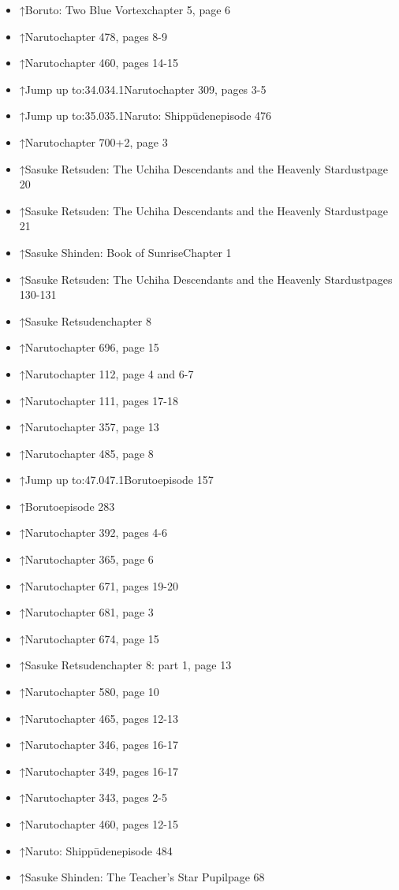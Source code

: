 \documentclass[a4paper,12pt]{article}
\begin{document}
\begin{itemize}
\item ↑Boruto: Two Blue Vortexchapter 5, page 6
\item ↑Narutochapter 478, pages 8-9
\item ↑Narutochapter 460, pages 14-15
\item ↑Jump up to:34.034.1Narutochapter 309, pages 3-5
\item ↑Jump up to:35.035.1Naruto: Shippūdenepisode 476
\item ↑Narutochapter 700+2, page 3
\item ↑Sasuke Retsuden: The Uchiha Descendants and the Heavenly Stardustpage 20
\item ↑Sasuke Retsuden: The Uchiha Descendants and the Heavenly Stardustpage 21
\item ↑Sasuke Shinden: Book of SunriseChapter 1
\item ↑Sasuke Retsuden: The Uchiha Descendants and the Heavenly Stardustpages 130-131
\item ↑Sasuke Retsudenchapter 8
\item ↑Narutochapter 696, page 15
\item ↑Narutochapter 112, page 4 and 6-7
\item ↑Narutochapter 111, pages 17-18
\item ↑Narutochapter 357, page 13
\item ↑Narutochapter 485, page 8
\item ↑Jump up to:47.047.1Borutoepisode 157
\item ↑Borutoepisode 283
\item ↑Narutochapter 392, pages 4-6
\item ↑Narutochapter 365, page 6
\item ↑Narutochapter 671, pages 19-20
\item ↑Narutochapter 681, page 3
\item ↑Narutochapter 674, page 15
\item ↑Sasuke Retsudenchapter 8: part 1, page 13
\item ↑Narutochapter 580, page 10
\item ↑Narutochapter 465, pages 12-13
\item ↑Narutochapter 346, pages 16-17
\item ↑Narutochapter 349, pages 16-17
\item ↑Narutochapter 343, pages 2-5
\item ↑Narutochapter 460, pages 12-15
\item ↑Naruto: Shippūdenepisode 484
\item ↑Sasuke Shinden: The Teacher's Star Pupilpage 68

\end{itemize}
\end{document}
